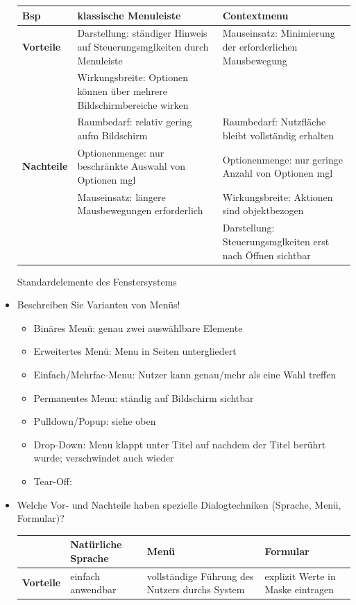 \begin{itemize}
\begin{table}[!h]
\begin{tabular}{|l|p{15em}|p{15em}|}
			\textbf{Bsp} &klassische Menuleiste & Contextmenu\\
			\hline			
			\textbf{Vorteile} & Darstellung: ständiger Hinweis auf Steuerungsmglkeiten durch Menuleiste & Mauseinsatz: Minimierung der erforderlichen Mausbewegung\\
			& Wirkungsbreite: Optionen können über mehrere Bildschirmbereiche wirken & \\
			& Raumbedarf: relativ gering aufm Bildschirm& Raumbedarf: Nutzfläche bleibt vollständig erhalten\\
			\hline
			\textbf{Nachteile} & Optionenmenge: nur beschränkte Auswahl von Optionen mgl & Optionenmenge: nur geringe Anzahl von Optionen mgl \\
			& Mauseinsatz: längere Mausbewegungen erforderlich & Wirkungsbreite: Aktionen sind objektbezogen\\
			&&Darstellung: Steuerungsmglkeiten erst nach Öffnen sichtbar \\
			\hline
		\end{tabular}
	\end{table}
	Standardelemente des Fenstersystems
	\item Beschreiben Sie Varianten von Menüs!
	\begin{itemize}
		\item Binäres Menü: genau zwei auswählbare Elemente
		\item Erweitertes Menü: Menu in Seiten untergliedert
		\item Einfach/Mehrfac-Menu: Nutzer kann genau/mehr als eine Wahl treffen
		\item Permanentes Menu: ständig auf Bildschirm sichtbar
		\item Pulldown/Popup: siehe oben
		\item Drop-Down: Menu klappt unter Titel auf nachdem der Titel berührt wurde; verschwindet auch wieder
		\item Tear-Off: 
	\end{itemize}
	\newpage
	\item Welche Vor- und Nachteile haben spezielle Dialogtechniken (Sprache, Menü, Formular)?
	\begin{table}[!h]
		\centering
		\begin{tabular}{|l|p{13em}|p{13em}|p{13em}|}
			\hline
			&\textbf{Natürliche Sprache} & \textbf{Menü} & \textbf{Formular}\\
			\hline
			\hline
			\textbf{Vorteile} & einfach anwendbar & vollständige Führung des Nutzers durchs System & explizit Werte in Maske eintragen\\

\end{tabular}
\end{table}
\end{itemize}

